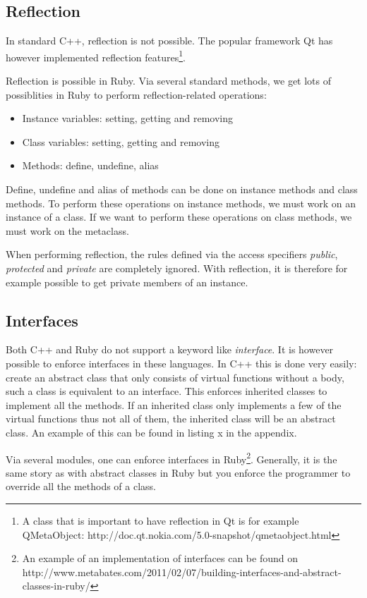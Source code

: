 \documentclass[10pt,a4paper,twocolumn]{article}
\begin{document}
\subsection{Reflection}
In standard C++, reflection is not possible. The popular framework Qt has however implemented reflection features\footnote{A class that is important to have reflection in Qt is for example QMetaObject: http://doc.qt.nokia.com/5.0-snapshot/qmetaobject.html}.

Reflection is possible in Ruby. Via several standard methods, we get lots of possiblities in Ruby to perform reflection-related operations:

\begin{itemize}
\item Instance variables: setting, getting and removing
\item Class variables: setting, getting and removing
\item Methods: define, undefine, alias
\end{itemize}

Define, undefine and alias of methods can be done on instance methods and class methods. To perform these operations on instance methods, we must work on an instance of a class. If we want to perform these operations on class methods, we must work on the metaclass.

When performing reflection, the rules defined via the access specifiers \textit{public}, \textit{protected} and \textit{private} are completely ignored. With reflection, it is therefore for example possible to get private members of an instance.

\subsection{Interfaces}

Both C++ and Ruby do not support a keyword like \textit{interface}. It is however possible to enforce interfaces in these languages. In C++ this is done very easily: create an abstract class that only consists of virtual functions without a body, such a class is equivalent to an interface. This enforces inherited classes to implement all the methods. If an inherited class only implements a few of the virtual functions thus not all of them, the inherited class will be an abstract class. An example of this can be found in listing x in the appendix.

Via several modules, one can enforce interfaces in Ruby\footnote{An example of an implementation of interfaces can be found on http://www.metabates.com/2011/02/07/building-interfaces-and-abstract-classes-in-ruby/}. Generally, it is the same story as with abstract classes in Ruby but you enforce the programmer to override all the methods of a class.
\end{document}
